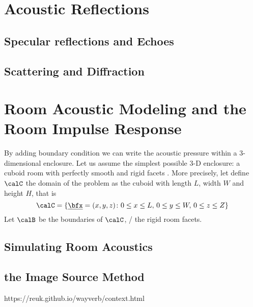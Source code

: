 

\section{Acoustic Reflections}
\subsection{Specular reflections and Echoes}

\subsection{Scattering and Diffraction}

\section{Room Acoustic Modeling and the Room Impulse Response}
By adding boundary condition we can write the acoustic pressure within a 3-dimensional enclosure.
Let us assume the simplest possible 3-D enclosure: a cuboid room with perfectly smooth and rigid facets
.
More precisely, let define $\calC$ the domain of the problem as the cuboid with length $L$, width $W$ and height $H$, that is
\begin{equation}
    \calC = \kset{\positionMicrophone = (x,y,z)}{
        0 \le x \le L,\,
        0 \le y \le W,\,
        0 \le z \le Z}
\end{equation}
Let $\calB$ be the boundaries of $\calC$, \ie/ the rigid room facets.



\subsection{Simulating Room Acoustics}


\subsection{the Image Source Method}
https://reuk.github.io/wayverb/context.html

